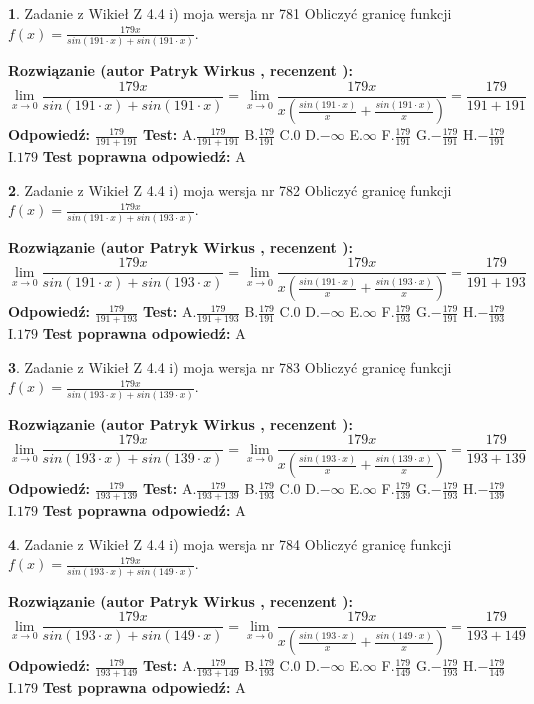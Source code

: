 \documentclass[12pt, a4paper]{article}
\theoremstyle{definition} %
\newtheorem{zad}{}
\newcommand{\zadStart}[1]{\begin{zad}#1\newline}
\newcommand{\zadStop}{\end{zad}}
\newcommand{\rozwStart}[2]{\noindent \textbf{Rozwiązanie (autor #1 , recenzent #2): }\newline}
\newcommand{\rozwStop}{\newline}
\newcommand{\odpStart}{\noindent \textbf{Odpowiedź:}\newline}
\newcommand{\odpStop}{\newline}
\newcommand{\testStart}{\noindent \textbf{Test:}\newline}
\newcommand{\testStop}{\newline}
\newcommand{\kluczStart}{\noindent \textbf{Test poprawna odpowiedź:}\newline}
\newcommand{\kluczStop}{\newline}
\begin{document}
\zadStart{Zadanie z Wikieł Z 4.4 i) moja wersja nr 781}
Obliczyć granicę funkcji $f(x)=\frac{179x}{sin(191\cdot x) +sin(191\cdot x)}$.
\zadStop
\rozwStart{Patryk Wirkus}{}
$$\lim\limits_{x\to 0}\frac{179x}{sin(191\cdot x) +sin(191\cdot x)}=\lim\limits_{x\to 0}\frac{179x}{x(\frac{sin(191\cdot x)}{x}+\frac{sin(191\cdot x)}{x})}=\frac{179}{191+191}$$
\rozwStop
\odpStart
$\frac{179}{191+191}$
\odpStop
\testStart
A.$\frac{179}{191+191}$
B.$\frac{179}{191}$
C.$0$
D.$-\infty$
E.$\infty$
F.$\frac{179}{191}$
G.$-\frac{179}{191}$
H.$-\frac{179}{191}$
I.$179$
\testStop
\kluczStart
A
\kluczStop



\zadStart{Zadanie z Wikieł Z 4.4 i) moja wersja nr 782}
Obliczyć granicę funkcji $f(x)=\frac{179x}{sin(191\cdot x) +sin(193\cdot x)}$.
\zadStop
\rozwStart{Patryk Wirkus}{}
$$\lim\limits_{x\to 0}\frac{179x}{sin(191\cdot x) +sin(193\cdot x)}=\lim\limits_{x\to 0}\frac{179x}{x(\frac{sin(191\cdot x)}{x}+\frac{sin(193\cdot x)}{x})}=\frac{179}{191+193}$$
\rozwStop
\odpStart
$\frac{179}{191+193}$
\odpStop
\testStart
A.$\frac{179}{191+193}$
B.$\frac{179}{191}$
C.$0$
D.$-\infty$
E.$\infty$
F.$\frac{179}{193}$
G.$-\frac{179}{191}$
H.$-\frac{179}{193}$
I.$179$
\testStop
\kluczStart
A
\kluczStop



\zadStart{Zadanie z Wikieł Z 4.4 i) moja wersja nr 783}
Obliczyć granicę funkcji $f(x)=\frac{179x}{sin(193\cdot x) +sin(139\cdot x)}$.
\zadStop
\rozwStart{Patryk Wirkus}{}
$$\lim\limits_{x\to 0}\frac{179x}{sin(193\cdot x) +sin(139\cdot x)}=\lim\limits_{x\to 0}\frac{179x}{x(\frac{sin(193\cdot x)}{x}+\frac{sin(139\cdot x)}{x})}=\frac{179}{193+139}$$
\rozwStop
\odpStart
$\frac{179}{193+139}$
\odpStop
\testStart
A.$\frac{179}{193+139}$
B.$\frac{179}{193}$
C.$0$
D.$-\infty$
E.$\infty$
F.$\frac{179}{139}$
G.$-\frac{179}{193}$
H.$-\frac{179}{139}$
I.$179$
\testStop
\kluczStart
A
\kluczStop



\zadStart{Zadanie z Wikieł Z 4.4 i) moja wersja nr 784}
Obliczyć granicę funkcji $f(x)=\frac{179x}{sin(193\cdot x) +sin(149\cdot x)}$.
\zadStop
\rozwStart{Patryk Wirkus}{}
$$\lim\limits_{x\to 0}\frac{179x}{sin(193\cdot x) +sin(149\cdot x)}=\lim\limits_{x\to 0}\frac{179x}{x(\frac{sin(193\cdot x)}{x}+\frac{sin(149\cdot x)}{x})}=\frac{179}{193+149}$$
\rozwStop
\odpStart
$\frac{179}{193+149}$
\odpStop
\testStart
A.$\frac{179}{193+149}$
B.$\frac{179}{193}$
C.$0$
D.$-\infty$
E.$\infty$
F.$\frac{179}{149}$
G.$-\frac{179}{193}$
H.$-\frac{179}{149}$
I.$179$
\testStop
\kluczStart
A
\kluczStop
\end{document}
